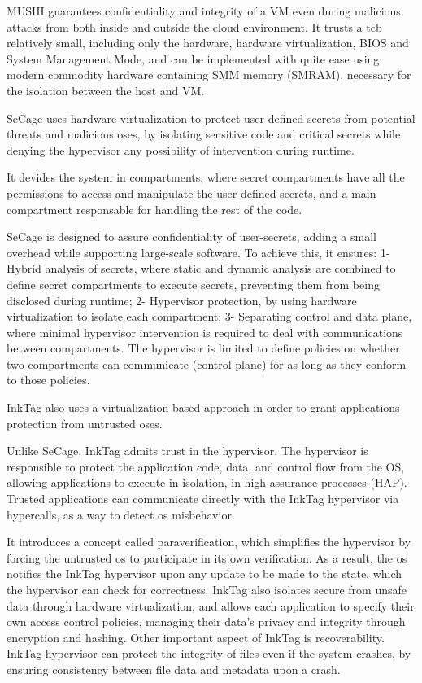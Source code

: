 MUSHI guarantees confidentiality and integrity of a VM even during malicious attacks from both inside and outside the cloud environment.
It trusts a \gls{tcb} relatively small, including only the hardware, hardware virtualization, BIOS and System Management Mode, and can be implemented with quite ease using modern commodity hardware containing SMM memory (SMRAM), necessary for the isolation between the host and VM.



SeCage \cite{SeCagePaper} uses hardware virtualization to protect user-defined secrets from potential threats and malicious \gls{os}es, by isolating sensitive code and critical secrets while denying the hypervisor any possibility of intervention during runtime.

It devides the system in compartments, where secret compartments have all the permissions to access and manipulate the user-defined secrets, and a main compartment responsable for handling the rest of the code.

SeCage is designed to assure confidentiality of user-secrets, adding a small overhead while supporting large-scale software. To achieve this, it ensures: 1- Hybrid analysis of secrets, where static and dynamic analysis are combined to define secret compartments to execute secrets, preventing them from being disclosed during runtime; 2- Hypervisor protection, by using hardware virtualization to isolate each compartment; 3- Separating control and data plane, where minimal hypervisor intervention is required to deal with communications between compartments. The hypervisor is limited to define policies on whether two compartments can communicate (control plane) for as long as they conform to those policies. 


InkTag \cite{inkTagPaper} also uses a virtualization-based approach in order to grant applications protection from untrusted \gls{os}es.

Unlike SeCage, InkTag admits trust in the hypervisor. The hypervisor is responsible to protect the application
code, data, and control flow from the OS, allowing applications to execute in isolation, in high-assurance processes (HAP). Trusted applications can communicate directly with the InkTag hypervisor via hypercalls, as a way to detect \gls{os} misbehavior.

It introduces a concept called paraverification, which simplifies the hypervisor by forcing the untrusted \gls{os} to participate in its own verification. As a result, the \gls{os} notifies the InkTag hypervisor upon any update to be made to the state, which the hypervisor can check for correctness. 
InkTag also isolates secure from unsafe data through hardware virtualization, and allows each application to specify their own access control policies, managing their data's privacy and integrity through encryption and hashing.
Other important aspect of InkTag is recoverability. InkTag hypervisor can protect the integrity of files even if the system crashes, by ensuring consistency between file data and metadata upon a crash.


